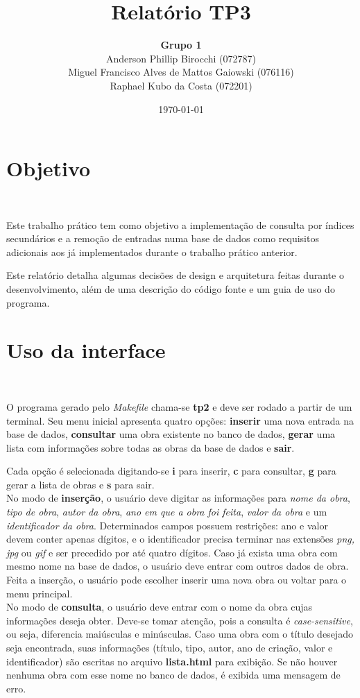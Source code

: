 \documentclass{article}
\title{\textbf{Relatório TP3}}
\author{\textbf{Grupo 1} \\
  Anderson Phillip Birocchi (072787) \\
  Miguel Francisco Alves de Mattos Gaiowski (076116) \\
  Raphael Kubo da Costa (072201)}
\date{\today}
\begin{document}
\maketitle

\section{Objetivo}\

Este trabalho prático tem como objetivo a implementação de consulta por índices secundários e a remoção de entradas numa base de dados como requisitos adicionais aos já implementados durante o trabalho prático anterior.

Este relatório detalha algumas decisões de design e arquitetura feitas durante o desenvolvimento, além de uma descrição do código fonte e um guia de uso do programa.

\section{Uso da interface}\

O programa gerado pelo \textit{Makefile} chama-se \textbf{tp2} e deve ser rodado a partir de um terminal. Seu menu inicial apresenta quatro opções: \textbf{inserir} uma nova entrada na base de dados, \textbf{consultar} uma obra existente no banco de dados, \textbf{gerar} uma lista com informações sobre todas as obras da base de dados e \textbf{sair}.

Cada opção é selecionada digitando-se \textbf{i} para inserir, \textbf{c} para consultar, \textbf{g} para gerar a lista de obras e \textbf{s} para sair.\\

No modo de \textbf{inserção}, o usuário deve digitar as informações para \textit{nome da obra}, \textit{tipo de obra}, \textit{autor da obra}, \textit{ano em que a obra foi feita}, \textit{valor da obra} e um \textit{identificador da obra}. Determinados campos possuem restrições: ano e valor devem conter apenas dígitos, e o identificador precisa terminar nas extensões \textit{png, jpg} ou \textit{gif} e ser precedido por até quatro dígitos. Caso já exista uma obra com mesmo nome na base de dados, o usuário deve entrar com outros dados de obra. Feita a inserção, o usuário pode escolher inserir uma nova obra ou voltar para o menu principal.\\

No modo de \textbf{consulta}, o usuário deve entrar com o nome da obra cujas informações deseja obter. Deve-se tomar atenção, pois a consulta é \textit{case-sensitive}, ou seja, diferencia maiúsculas e minúsculas. Caso uma obra com o título desejado seja encontrada, suas informações (título, tipo, autor, ano de criação, valor e identificador) são escritas no arquivo \textbf{lista.html} para exibição. Se não houver nenhuma obra com esse nome no banco de dados, é exibida uma mensagem de erro.\\
\end{document}
